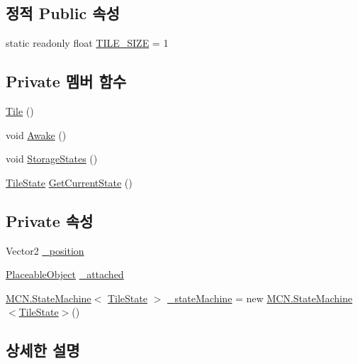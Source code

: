 \subsection*{정적 Public 속성}
\begin{DoxyCompactItemize}
\item 
static readonly float \hyperlink{class_tile_a51b7dea4344573ba12a461a32517e683}{T\+I\+L\+E\+\_\+\+S\+I\+ZE} = 1
\end{DoxyCompactItemize}
\subsection*{Private 멤버 함수}
\begin{DoxyCompactItemize}
\item 
\hyperlink{class_tile_a7684d2e86beeb06d844ebb7819b11b33}{Tile} ()
\item 
void \hyperlink{class_tile_a4fbf82b2a26cdeb792dc78192d7247dc}{Awake} ()
\item 
void \hyperlink{class_tile_a6cb69a9fad04bee1fa3473aec22428de}{Storage\+States} ()
\item 
\hyperlink{class_tile_1_1_tile_state}{Tile\+State} \hyperlink{class_tile_ae37e08e39263e766fdc612de94fb7a0d}{Get\+Current\+State} ()
\end{DoxyCompactItemize}
\subsection*{Private 속성}
\begin{DoxyCompactItemize}
\item 
Vector2 \hyperlink{class_tile_a56d02616cede51da0afdceff82ca958d}{\+\_\+position}
\item 
\hyperlink{class_placeable_object}{Placeable\+Object} \hyperlink{class_tile_aa548ae60732f4d054b6777436baefdd5}{\+\_\+attached}
\item 
\hyperlink{class_m_c_n_1_1_state_machine}{M\+C\+N.\+State\+Machine}$<$ \hyperlink{class_tile_1_1_tile_state}{Tile\+State} $>$ \hyperlink{class_tile_a822a1bffe56b1193b8c5c61070ea7827}{\+\_\+state\+Machine} = new \hyperlink{class_m_c_n_1_1_state_machine}{M\+C\+N.\+State\+Machine}$<$\hyperlink{class_tile_1_1_tile_state}{Tile\+State}$>$()
\end{DoxyCompactItemize}


\subsection{상세한 설명}


